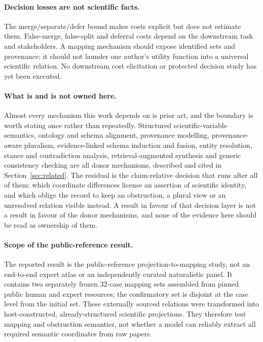 \paragraph{Decision losses are not scientific facts.}
The merge/separate/defer bound makes costs explicit but does not estimate them.
False-merge, false-split and deferral costs depend on the downstream task and
stakeholders. A mapping mechanism should expose identified sets and provenance;
it should not launder one author's utility function into a universal
scientific relation. No downstream cost elicitation or protected decision
study has yet been executed.

\paragraph{What is and is not owned here.}
Almost every mechanism this work depends on is prior art, and the boundary is
worth stating once rather than repeatedly. Structured scientific-variable
semantics, ontology and schema alignment, provenance modelling,
provenance-aware pluralism, evidence-linked schema induction and fusion,
entity resolution, stance and contradiction analysis, retrieval-augmented
synthesis and generic consistency checking are all donor mechanisms, described
and cited in Section~\ref{sec:related}. The residual is the claim-relative
decision that runs after all of them: which coordinate differences license an
assertion of scientific identity, and which oblige the record to keep an
obstruction, a plural view or an unresolved relation visible instead. A result
in favour of that decision layer is not a result in favour of the donor
mechanisms, and none of the evidence here should be read as ownership of them.

\paragraph{Scope of the public-reference result.}
The reported result is the public-reference projection-to-mapping study, not
an end-to-end expert atlas or an independently curated naturalistic panel. It
contains two separately frozen
32-case mapping sets assembled from pinned public human and expert resources;
the confirmatory set is disjoint at the case level from the initial set. These
externally sourced relations were transformed into host-constructed,
already-structured scientific projections. They therefore test
mapping and obstruction semantics, not whether a model can reliably extract
all required semantic coordinates from raw papers.

